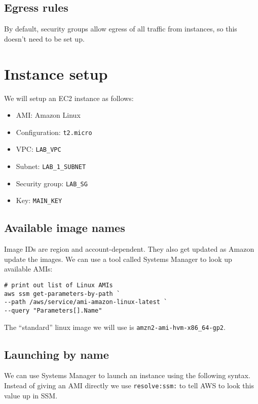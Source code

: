 \subsection{Egress rules}\label{egress-rules}

By default, security groups allow egress of all traffic from instances,
so this doesn't need to be set up.

\section{Instance setup}\label{instance-setup}

We will setup an EC2 instance as follows:

\begin{itemize}
\item
  AMI: Amazon Linux
\item
  Configuration: \texttt{t2.micro}
\item
  VPC: \texttt{LAB\_VPC}
\item
  Subnet: \texttt{LAB\_1\_SUBNET}
\item
  Security group: \texttt{LAB\_SG}
\item
  Key: \texttt{MAIN\_KEY}
\end{itemize}


\subsection{Available image names}\label{available-image-names}

Image IDs are region and account-dependent. They also get updated as
Amazon update the images.
We can use a tool called Systems Manager to look up available AMIs:

\begin{verbatim}
# print out list of Linux AMIs
aws ssm get-parameters-by-path `
--path /aws/service/ami-amazon-linux-latest `
--query "Parameters[].Name"
\end{verbatim}

The ``standard'' linux image we will use is \texttt{amzn2-ami-hvm-x86\_64-gp2}.

\subsection{Launching by name}\label{launching-by-name}

We can use Systems Manager to launch an instance using the following
syntax. Instead of giving an AMI directly we use \texttt{resolve:ssm:}
to tell AWS to look this value up in SSM.

